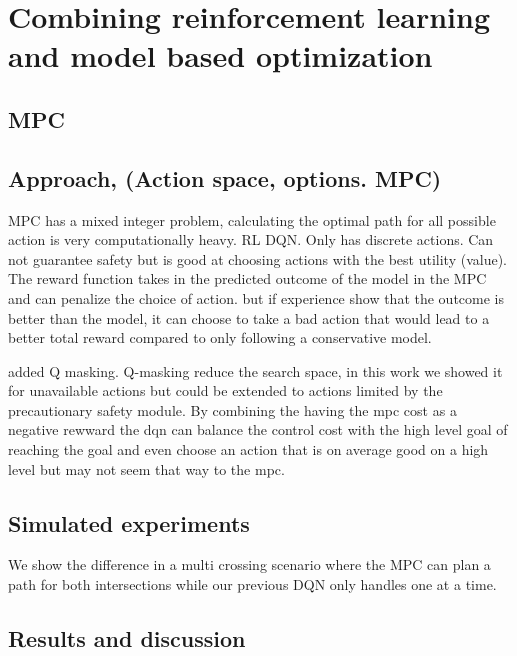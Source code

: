 \chapter{Combining reinforcement learning and model based optimization}
\section{MPC}

\section{Approach, (Action space, options. MPC)}
MPC has a mixed integer problem, calculating the optimal path for all possible action is very computationally heavy. 
RL DQN. Only has discrete actions. Can not guarantee safety but is good at choosing actions with the best utility (value). 
The reward function takes in the predicted outcome of the model in the MPC and can penalize the choice of action. but if experience show that the outcome is better than the model, it can choose to take a bad action that would lead to a better total reward compared to only following a conservative model. 


added Q masking.
Q-masking reduce the search space, in this work we showed it for unavailable actions but could be extended to actions limited by the precautionary safety module. 
By combining the having the mpc cost as a negative rewward the \gls{dqn} can balance the control cost with the high level goal of reaching the goal and even choose an action that is on average good on a high level but may not seem that way to the \gls{mpc}.
\section{Simulated experiments}
We show the difference in a multi crossing scenario where the MPC can plan a path for both intersections while our previous DQN only handles one at a time. 

\section{Results and discussion}

